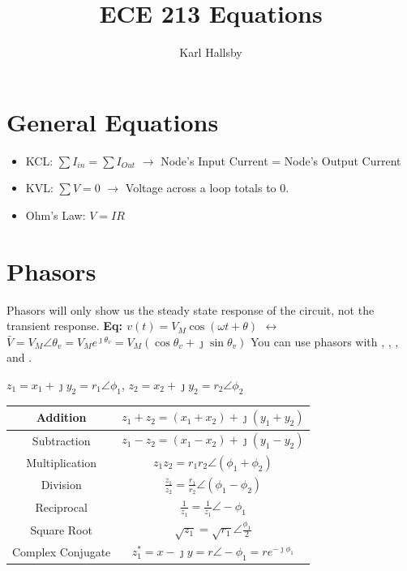 \documentclass[10pt,letterpaper,final,twoside,notitlepage]{article}
\author{Karl Hallsby}
\title{ECE 213 Equations}
\begin{document}
\section*{General Equations}
	\begin{itemize}[noitemsep] %
		\item KCL: $\sum I_{in} = \sum I_{Out}$ $\rightarrow$ Node's Input Current = Node's Output Current
		\item KVL: $\sum V = 0$ $\rightarrow$ Voltage across a loop totals to 0.
		\item Ohm's Law: $V=IR$
	\end{itemize}

\section*{Phasors} \label{sec:Phasors}
Phasors will only show us the steady state response of the circuit, not the transient response. \newline 
\textbf{\large Eq: $v(t)=V_{M} \cos \left(\omega t + \theta \right)$ $\leftrightarrow$ $\bar{V}=V_{M} \angle \theta_{v} = V_{M}e^{\jmath \theta_{v}} = V_{M}\left(\cos \theta_{v} + \jmath \sin \theta_{v}\right)$} \newline
You can use phasors with , , , and . \newline
	\begin{table}[ht] %
		\centering
		\renewcommand{\arraystretch}{1.4}
		$z_1=x_1+\jmath y_2=r_1\angle\phi_1$, $z_2=x_2+\jmath y_2=r_2\angle\phi_2$
		\begin{tabular}{|c|c|} 
			\hline
			Addition & $z_1+z_2=\left( x_1+x_2 \right)+ \jmath \left( y_1+y_2 \right)$ \\ \hline
			Subtraction & $z_1-z_2=\left( x_1-x_2 \right)+ \jmath \left( y_1-y_2 \right)$ \\ \hline
			Multiplication & $z_{1}z_{2}=r_{1}r_{2}\angle \left( \phi_1 + \phi_2 \right)$ \\ \hline
			Division & $\frac{z_{1}}{z_{2}} = \frac{r_{1}}{r_{2}} \angle \left(\phi_1 - \phi_2 \right)$ \\ \hline
			Reciprocal & $\frac{1}{z_1}=\frac{1}{z_1} \angle -\phi_1$ \\ \hline
			Square Root & $\sqrt{z_1}=\sqrt{r_1} \angle \frac{\phi_1}{2}$ \\ \hline
			Complex Conjugate & $ z_1^*=x- \jmath y=r \angle -\phi_1=re^{-\jmath \phi_1}$\\ \hline
		\end{tabular}
	\end{table}
	\vspace{-8mm}
\end{document}
